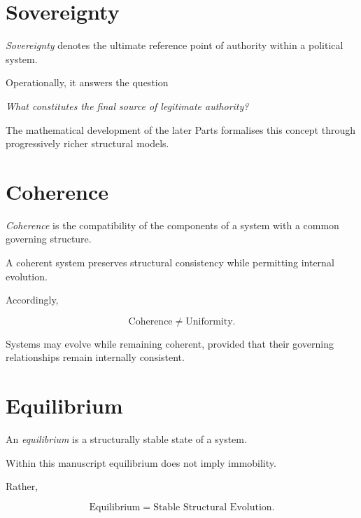 \documentclass[11pt,openany]{book}
\theoremstyle{plain}
\theoremstyle{definition}
\begin{document}

\section*{Sovereignty}

\emph{Sovereignty} denotes the ultimate reference point of authority within a political system.

Operationally, it answers the question

\begin{center}
\emph{What constitutes the final source of legitimate authority?}
\end{center}

The mathematical development of the later Parts formalises this concept through progressively richer structural models.


\section*{Coherence}

\emph{Coherence} is the compatibility of the components of a system with a common governing structure.

A coherent system preserves structural consistency while permitting internal evolution.

Accordingly,

\[
\boxed{
\text{Coherence}
\neq
\text{Uniformity}.
}
\]

Systems may evolve while remaining coherent, provided that their governing relationships remain internally consistent.


\section*{Equilibrium}

An \emph{equilibrium} is a structurally stable state of a system.

Within this manuscript equilibrium does not imply immobility.

Rather,

\[
\boxed{
\text{Equilibrium}
=
\text{Stable Structural Evolution}.
}
\]

\end{document}
